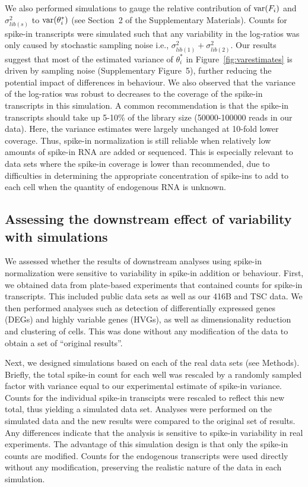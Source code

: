 \documentclass{article}
\newcommand{\suppfignoise}{5}
\newcommand{\suppsecnoise}{2}
\begin{document}
We also performed simulations to gauge the relative contribution of $\mbox{var}(F_i)$ and $\sigma^2_{lib(s)}$ to $\mbox{var}(\theta^*_i)$ (see Section~\suppsecnoise{} of the Supplementary Materials).
Counts for spike-in transcripts were simulated such that any variability in the log-ratios was only caused by stochastic sampling noise i.e., $\sigma^2_{lib(1)} + \sigma^2_{lib(2)}$.
Our results suggest that most of the estimated variance of $\theta^*_i$ in Figure~\ref{fig:varestimates} is driven by sampling noise (Supplementary Figure~\suppfignoise{}), further reducing the potential impact of differences in behaviour.
We also observed that the variance of the log-ratios was robust to decreases to the coverage of the spike-in transcripts in this simulation.
A common recommendation is that the spike-in transcripts should take up 5-10\% of the library size (50000-100000 reads in our data).
Here, the variance estimates were largely unchanged at 10-fold lower coverage.
Thus, spike-in normalization is still reliable when relatively low amounts of spike-in RNA are added or sequenced.
This is especially relevant to data sets where the spike-in coverage is lower than recommended, due to difficulties in determining the appropriate concentration of spike-ins to add to each cell when the quantity of endogenous RNA is unknown.

\subsection{Assessing the downstream effect of variability with simulations}
We assessed whether the results of downstream analyses using spike-in normalization were sensitive to variability in spike-in addition or behaviour.
First, we obtained data from plate-based experiments that contained counts for spike-in transcripts.
This included public data sets \cite{segerstople2016single,islam2011characterization} as well as our 416B and TSC data.
We then performed analyses such as detection of differentially expressed genes (DEGs) and highly variable genes (HVGs), as well as dimensionality reduction and clustering of cells.
This was done without any modification of the data to obtain a set of ``original results''.

Next, we designed simulations based on each of the real data sets (see Methods).
Briefly, the total spike-in count for each well was rescaled by a randomly sampled factor with variance equal to our experimental estimate of spike-in variance.
Counts for the individual spike-in transcipts were rescaled to reflect this new total, thus yielding a simulated data set.
Analyses were performed on the simulated data and the new results were compared to the original set of results.
Any differences indicate that the analysis is sensitive to spike-in variability in real experiments.
The advantage of this simulation design is that only the spike-in counts are modified.
Counts for the endogenous transcripts were used directly without any modification, preserving the realistic nature of the data in each simulation.
\end{document}
